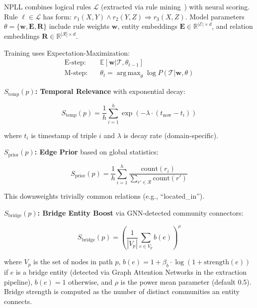 \documentclass[10pt,twocolumn]{article}
\DeclareMathOperator*{\argmax}{arg\,max}
\begin{document}
NPLL combines logical rules $\mathcal{L}$ (extracted via rule mining~\cite{yang2017differentiable}) with neural scoring. Rule $\ell \in \mathcal{L}$ has form: $r_1(X,Y) \wedge r_2(Y,Z) \Rightarrow r_3(X,Z)$. Model parameters $\theta = \{\mathbf{w}, \mathbf{E}, \mathbf{R}\}$ include rule weights $\mathbf{w}$, entity embeddings $\mathbf{E} \in \mathbb{R}^{|\mathcal{E}| \times d}$, and relation embeddings $\mathbf{R} \in \mathbb{R}^{|\mathcal{R}| \times d}$.

Training uses Expectation-Maximization:
\begin{align}
\text{E-step:} \quad & \mathbb{E}[\mathbf{w} | \mathcal{T}, \theta_{t-1}] \\
\text{M-step:} \quad & \theta_t = \argmax_{\theta} \log P(\mathcal{T} | \mathbf{w}, \theta)
\end{align}

\textbf{$S_{\text{temp}}(p)$: Temporal Relevance} with exponential decay:

\begin{equation}
S_{\text{temp}}(p) = \frac{1}{h} \sum_{i=1}^{h} \exp\left(-\lambda \cdot (t_{\text{now}} - t_i)\right)
\end{equation}

where $t_i$ is timestamp of triple $i$ and $\lambda$ is decay rate (domain-specific).

\textbf{$S_{\text{prior}}(p)$: Edge Prior} based on global statistics:

\begin{equation}
S_{\text{prior}}(p) = \frac{1}{h} \sum_{i=1}^{h} \frac{\text{count}(r_i)}{\sum_{r' \in \mathcal{R}} \text{count}(r')}
\end{equation}

This downweights trivially common relations (e.g., ``located\_in'').

\textbf{$S_{\text{bridge}}(p)$: Bridge Entity Boost} via GNN-detected community connectors:

\begin{equation}
S_{\text{bridge}}(p) = \left(\frac{1}{|V_p|} \sum_{e \in V_p} b(e)\right)^{\rho}
\end{equation}

where $V_p$ is the set of nodes in path $p$, $b(e) = 1 + \beta_b \cdot \log(1 + \text{strength}(e))$ if $e$ is a bridge entity (detected via Graph Attention Networks in the extraction pipeline), $b(e) = 1$ otherwise, and $\rho$ is the power mean parameter (default 0.5). Bridge strength is computed as the number of distinct communities an entity connects.
\end{document}
